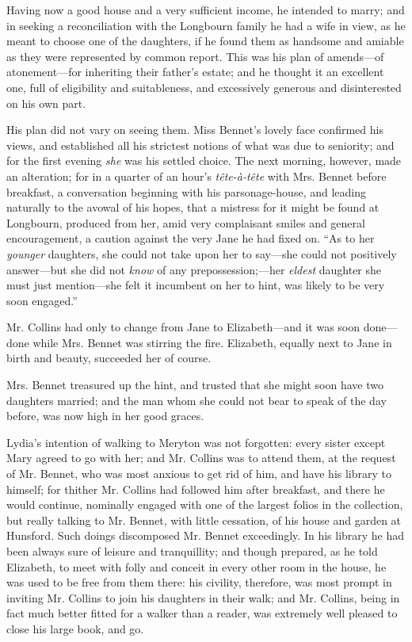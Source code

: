 \documentclass[12pt,openright]{book}
\begin{document}
Having now a good house and a very sufficient income, he intended to marry; and in seeking a reconciliation with the Longbourn family he had a wife in view, as he meant to choose one of the daughters, if he found them as handsome and amiable as they were represented by common report. This was his plan of amends—of atonement—for inheriting their father’s estate; and he thought it an excellent one, full of eligibility and suitableness, and excessively generous and disinterested on his own part.

His plan did not vary on seeing them. Miss Bennet’s lovely face confirmed his views, and established all his strictest notions of what was due to seniority; and for the first evening \textit{she} was his settled choice. The next morning, however, made an alteration; for in a quarter of an hour’s \textit{tête-à-tête} with Mrs. Bennet before breakfast, a conversation beginning with his parsonage-house, and leading naturally to the avowal of his hopes, that a mistress for it might be found at Longbourn, produced from her, amid very complaisant smiles and general encouragement, a caution against the very Jane he had fixed on. “As to her \textit{younger} daughters, she could not take upon her to say—she could not positively answer—but she did not \textit{know} of any prepossession;—her \textit{eldest} daughter she must just mention—she felt it incumbent on her to hint, was likely to be very soon engaged.”

Mr. Collins had only to change from Jane to Elizabeth—and it was soon done—done while Mrs. Bennet was stirring the fire. Elizabeth, equally next to Jane in birth and beauty, succeeded her of course.

Mrs. Bennet treasured up the hint, and trusted that she might soon have two daughters married; and the man whom she could not bear to speak of the day before, was now high in her good graces.

Lydia’s intention of walking to Meryton was not forgotten: every sister except Mary agreed to go with her; and Mr. Collins was to attend them, at the request of Mr. Bennet, who was most anxious to get rid of him, and have his library to himself; for thither Mr. Collins had followed him after breakfast, and there he would continue, nominally engaged with one of the largest folios in the collection, but really talking to Mr. Bennet, with little cessation, of his house and garden at Hunsford. Such doings discomposed Mr. Bennet exceedingly. In his library he had been always sure of leisure and tranquillity; and though prepared, as he told Elizabeth, to meet with folly and conceit in every other room in the house, he was used to be free from them there: his civility, therefore, was most prompt in inviting Mr. Collins to join his daughters in their walk; and Mr. Collins, being in fact much better fitted for a walker than a reader, was extremely well pleased to close his large book, and go.
\end{document}
